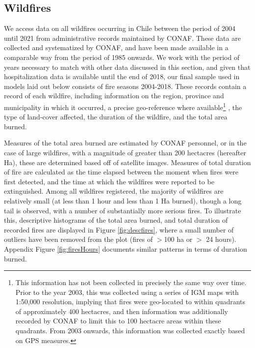 \documentclass[11pt]{article}
\begin{document}
\begin{spacing}{1.3}
\subsection{Wildfires}
\label{sscn:fires} 
We access data on all wildfires occurring in Chile between the period of 2004 until 2021 from administrative records maintained by CONAF.  These data are collected and systematized by CONAF, and have been made available in a comparable way from the period of 1985 onwards. We work with the period of years necessary to match with other data discussed in this section, and given that hospitalization data is available until the end of 2018, our final sample used in models laid out below consists of fire seasons 2004-2018.  These records contain a record of each wildfire, including information on the region, province and municipality in which it occurred, a precise geo-reference where available\footnote{This information has not been collected in precisely the same way over time.  Prior to the year 2003, this was collected using a series of IGM maps with 1:50,000 resolution, implying that fires were geo-located to within quadrants of approximately 400 hectacres, and then information was additionally recorded by CONAF to limit this to 100 hectacre areas within these quadrants.  From 2003 onwards, this information was collected exactly based on GPS measures.}%
, the type of land-cover affected, the duration of the wildfire, and the total area burned.  

Measures of the total area burned are estimated by CONAF personnel, or in the case of large wildfires, with a magnitude of greater than 200 hectacres (hereafter Ha), these are determined based off of satellite images. Measures of total duration of fire are calculated as the time elapsed between the moment when fires were first detected, and the time at which the wildfires were reported to be extinguished.  Among all wildfires registered, the majority of wildfires are relatively small (at less than 1 hour and less than 1 Ha burned), though a long tail is observed, with a number of substantially more serious fires.  To illustrate this, descriptive histograms of the total area burned, and total duration of recorded fires are displayed in Figure \ref{fig:descfires}, where a small number of outliers have been removed from the plot (fires of $>$100 ha or $>$ 24 hours).  Appendix Figure \ref{fig:firesHours} documents similar patterns in terms of duration burned.


\end{spacing}
\end{document}
